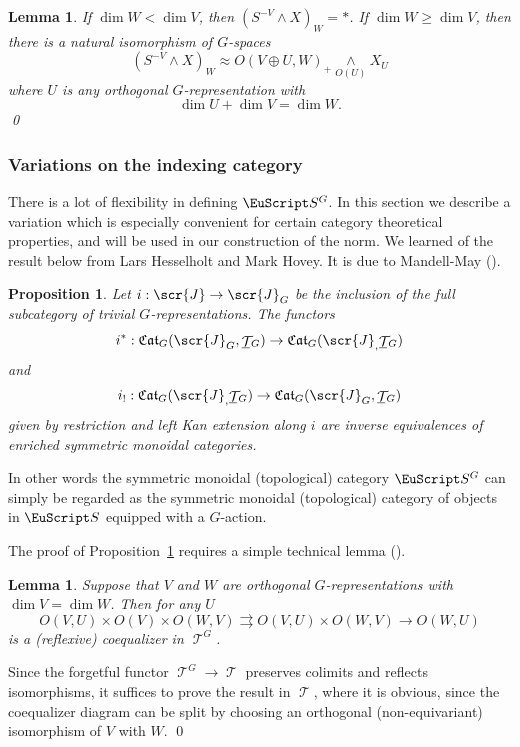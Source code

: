 \documentclass{amsart}
\newtheorem{lem}[equation]{Lemma}
\newtheorem{prop}[equation]{Proposition}
\theoremstyle{definition}
\theoremstyle{remark}
\newenvironment{pf}{\bigskip{\em Proof:\/}}{\qed\medskip}
\newcommand{\spectra}{\EuScript S}
\DeclareMathOperator{\spaces}{\mathcal T}
\newcommand{\smashove}[1]{\underset{#1}{\wedge}}
\newcommand{\icat}{\scr{J}}
\newcommand{\igcat}[1]{\icat_{#1}}
\newcommand{\gspaces}[1]{\underline{\spaces\mkern-4mu}\mkern4mu_{\!#1}}
\newcommand{\ugspaces}[1]{\spaces^{#1}}
\newcommand{\ugspectra}[1]{\spectra^{#1}}
\newcommand{\gcat}[1]{\mathfrak{Cat}_{#1}}
\begin{document}
\begin{lem}
\label{thm:111}
If $\dim W <\dim V$, then $(S^{-V}\wedge X)_{W}=\ast$.  If $\dim W\ge
\dim V$, then  there is a natural isomorphism of $G$-spaces
\[
(S^{-V}\wedge X)_{W} \approx O(V\oplus U,W)_{+}\smashove{O(U)} X_{U}
\]
where $U$ is any orthogonal $G$-representation with 
\[
\dim U+\dim V=\dim W.
\]
\qed
\end{lem}

\subsubsection{Variations on the indexing category}

There is a lot of flexibility in defining $\ugspectra G$.  In this
section we describe a variation which is especially convenient for
certain category theoretical properties, and will be used in our
construction of the norm.  We learned of the result below from Lars
Hesselholt and Mark Hovey.  It is due to Mandell-May
(\cite[Lemma~V.1.5]{MR1922205}).

\begin{prop}\label{thm:143}
Let $i:\icat\to \igcat G$ be the inclusion of the full subcategory of
trivial $G$-representations.  The functors 
\[
i^{\ast}:\gcat G(\igcat G,\gspaces G) \to \gcat G(\igcat, \gspaces G)
\]
and 
\[
i_{!}:\gcat G(\igcat,\gspaces G) \to \gcat G(\igcat G, \gspaces G)
\]
given by restriction and left Kan extension along $i$ are inverse
equivalences of enriched symmetric monoidal categories.
\end{prop}

In other words the symmetric monoidal (topological) category
$\ugspectra G$ can simply be regarded as the symmetric monoidal
(topological) category of objects in $\spectra$ equipped with a
$G$-action.

The proof of Proposition~\ref{thm:143} requires a simple technical
lemma (\cite[Lemma~V.1.1]{MR1922205}).

\begin{lem}
\label{thm:218}
Suppose that $V$ and $W$ are orthogonal $G$-represen\-ta\-tions with $\dim
V=\dim W$.  Then for any $U$
\[
O(V,U)\times O(V) \times O(W,V)\rightrightarrows
O(V,U) \times O(W,V)\to O(W,U)
\]
is a (reflexive) coequalizer in $\ugspaces G$.
\end{lem}

\begin{pf}
Since the forgetful functor $\ugspaces G\to \spaces$ preserves
colimits and reflects isomorphisms, it suffices to prove the result in
$\spaces$, where it is obvious, since the coequalizer diagram can be
split by choosing an orthogonal (non-equivariant) isomorphism of $V$
with $W$.
\end{pf}
\end{document}
